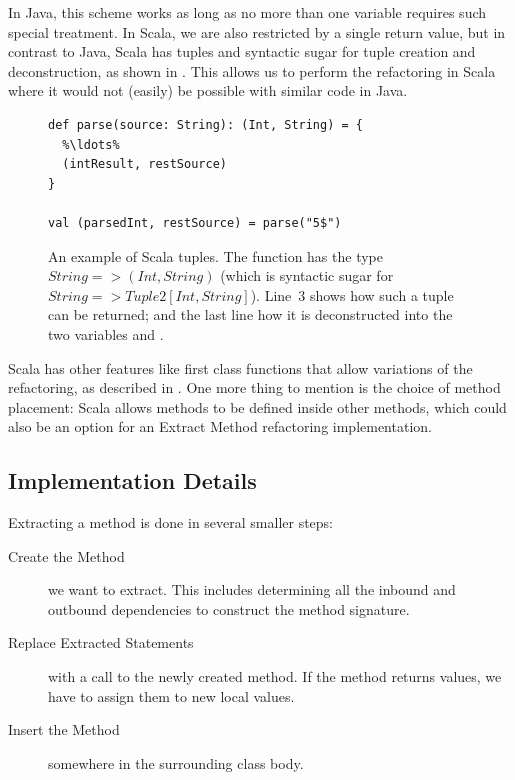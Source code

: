 \documentclass[10pt,a4paper,oneside]{scrreprt}
\begin{document}
In Java, this scheme works as long as no more than one variable requires such special treatment. In Scala, we are also restricted by a single return value, but in contrast to Java, Scala has tuples and syntactic sugar for tuple creation and deconstruction, as shown in . This allows us to perform the refactoring in Scala where it would not (easily) be possible with similar code in Java.

\begin{figure}
\begin{lstlisting}
def parse(source: String): (Int, String) = {
  %\ldots%
  (intResult, restSource)
}

val (parsedInt, restSource) = parse("5$")
\end{lstlisting}

\caption{An example of Scala tuples. The function  has the type $String => (Int, String)$ (which is syntactic sugar for $String => Tuple2[Int, String]$). Line~3 shows how such a tuple can be returned; and the last line how it is deconstructed into the two variables  and .}
\label{figure:tuple-deconstruction}
\end{figure}

Scala has other features like first class functions that allow variations of the refactoring, as described in \cite{ScalaRefactoring}. One more thing to mention is the choice of method placement: Scala allows methods to be defined inside other methods, which could also be an option for an Extract Method refactoring implementation.

\subsection{Implementation Details}

Extracting a method is done in several smaller steps:

\begin{description}
  \item[Create the Method] we want to extract. This includes determining all the inbound and outbound dependencies to construct the method signature.
  \item[Replace Extracted Statements] with a call to the newly created method. If the method returns values, we have to assign them to new local values.
  \item[Insert the Method] somewhere in the surrounding class body.
\end{description}
\end{document}
